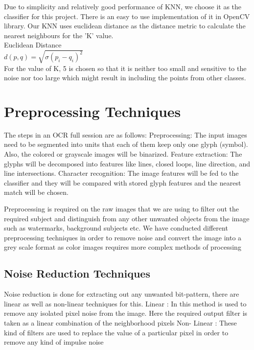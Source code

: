 \documentclass[9pt,twocolumn,twoside]{../../styles/osajnl}
\begin{document}
Due to simplicity and relatively good performance of KNN, we choose it 
as the classifier for this project. There is an easy to use implementation
of it in OpenCV library.
Our KNN uses euclidean distance as the distance metric to calculate the nearest neighbours for the 'K' value. \\
Euclidean Distance\\$ d(p,q) = \sqrt{ \sigma(p_i - q_i)^2}$\\
For the value of K, 5 is chosen so that it is neither too small and sensitive to the noise nor too large which might result in including the points from other classes.

\section {Preprocessing Techniques}

The steps in an OCR full session are as follows:
Preprocessing: The input images need to be segmented
into units that each of them keep only one glyph (symbol). Also, the
colored or grayscale images will be binarized.  
Feature extraction: The glyphs will be decomposed into features like lines, closed loops,
line direction, and line intersections.  
Character recognition: The
image features will be fed to the classifier and they will be
compared with stored glyph features and the nearest match will be
chosen.

Preprocessing is required on the raw images that we are using to
filter out the required subject and distinguish from any other
unwanted objects from the image such as watermarks, background
subjects etc. We have conducted different preprocessing techniques in
order to remove noise and convert the image into a grey scale format
as color images requires more complex methods of processing

\subsection{ Noise Reduction Techniques}

Noise reduction is done for extracting out any unwanted bit-pattern,
there are linear as well as non-linear techniques for this.  Linear :
In this method is used to remove any isolated pixel noise from the
image. Here the required output filter is taken as a linear
combination of the neighborhood pixels Non- Linear : These kind of
filters are used to replace the value of a particular pixel in order
to remove any kind of impulse noise
\end{document}
